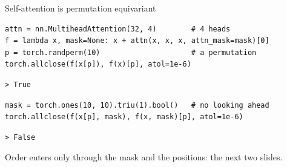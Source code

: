 \documentclass[10pt]{beamer}
\begin{document}
\begin{frame}[fragile]{Self-attention is permutation equivariant}
\begin{onlyenv}
\begin{lstlisting}[belowskip=2pt]
attn = nn.MultiheadAttention(32, 4)        # 4 heads
f = lambda x, mask=None: x + attn(x, x, x, attn_mask=mask)[0]
p = torch.randperm(10)                     # a permutation
torch.allclose(f(x[p]), f(x)[p], atol=1e-6)
\end{lstlisting}
\begin{lstlisting}[style=output]
> True
\end{lstlisting}
\begin{lstlisting}[belowskip=2pt]
mask = torch.ones(10, 10).triu(1).bool()   # no looking ahead
torch.allclose(f(x[p], mask), f(x, mask)[p], atol=1e-6)
\end{lstlisting}
\begin{lstlisting}[style=output]
> False
\end{lstlisting}

\smallskip
\alert{Order enters only through the mask and the positions}: the next two slides.
\end{onlyenv}
\end{frame}
\end{document}
